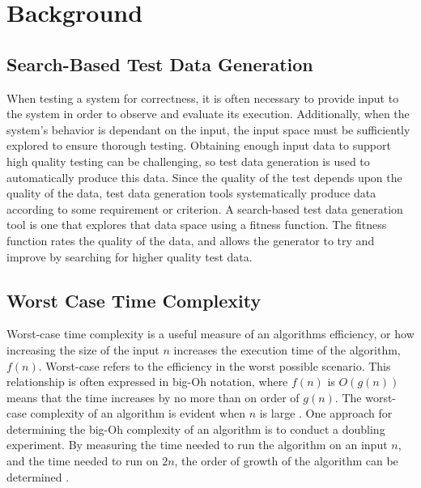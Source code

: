 \section{Background}


\subsection{Search-Based Test Data Generation}
When testing a system for correctness, it is often necessary to
provide input to the system in order to observe and evaluate its
execution. Additionally, when the system's behavior is dependant on the
input, the input space must be sufficiently explored to ensure thorough
testing.  Obtaining enough input data to support high quality testing can
be challenging, so test data generation is used to automatically
produce this data. Since the quality of the test depends upon the
quality of the data, test data generation tools systematically produce data
according to some requirement or criterion. A search-based test data 
generation tool is one that explores that data space using a fitness
function.  The fitness function rates the quality of the data, and allows
the generator to try and improve by searching for higher quality test data.




\subsection{Worst Case Time Complexity}

Worst-case time complexity is a useful measure of an algorithms
efficiency, or how increasing the size
of the input $n$ increases the execution time of the algorithm, $f(n)$.
Worst-case refers to the efficiency in the worst possible scenario.
This relationship is often expressed in big-Oh notation, where $f(n)$
is $O(g(n))$ means that the time increases by no more than on order of $g(n)$. The
worst-case complexity of an algorithm is evident when $n$ is large 
\cite{Goodrich:Data}. One approach for determining the big-Oh complexity
of an algorithm is to conduct a doubling experiment. By measuring the
time needed to run the algorithm on an input $n$, and the time needed to
run on $2n$, the order of growth of the algorithm can be determined \cite{Mcgeoch:Algorithmics,Sedgewick:Analysis}. 

